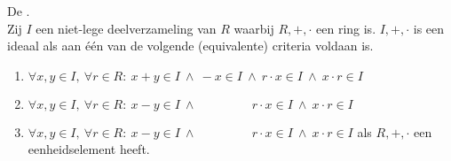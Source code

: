 \documentclass[main.tex]{subfiles}
\begin{document}
\begin{st}
  De .\\
  Zij $I$ een niet-lege deelverzameling van $R$ waarbij $R,+,\cdot$ een ring is.
  $I,+,\cdot$ is een ideaal als aan \'e\'en van de volgende (equivalente) criteria voldaan is.
  \begin{enumerate}
  \item $\forall x,y \in I,\ \forall r\in R:\ x+y\in I\ \wedge\ -x \in I\ \wedge\  r\cdot x\in I\ \wedge\ x\cdot r \in I$
  \item $\forall x,y \in I,\ \forall r\in R:\ x-y\in I\ \wedge\ \quad \quad \quad \quad\   r\cdot x\in I\ \wedge\ x\cdot r \in I$
  \item $\forall x,y \in I,\ \forall r\in R:\ x-y\in I\ \wedge\ \quad \quad \quad \quad\   r\cdot x\in I\ \wedge\ x\cdot r \in I$ als $R,+,\cdot$ een eenheidselement heeft.
  \end{enumerate}


\end{st}
\end{document}
